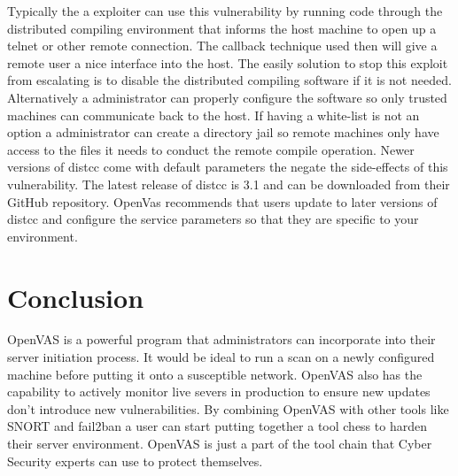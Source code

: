 \documentclass[12pt]{article}
\begin{document}
Typically the a exploiter can use this vulnerability by running code through
the distributed compiling environment that informs the host machine to open
up a telnet or other remote connection. The callback technique used then will
give a remote user a nice interface into the host. The easily solution to 
stop this exploit from escalating is to disable the distributed compiling
software if it is not needed. Alternatively a administrator can properly
configure the software so only trusted machines can communicate back to
the host. If having a white-list is not an option a administrator can create
a directory jail so remote machines only have access to the files it needs
to conduct the remote compile operation. Newer versions of distcc come with
default parameters the negate the side-effects of this vulnerability. The 
latest release of distcc is 3.1 and can be downloaded from their GitHub
repository. OpenVas recommends that users update to later versions of
distcc and configure the service parameters so that they are specific to
your environment. 

\section{Conclusion}
\label{sect:conclusion}
OpenVAS is a powerful program that administrators can incorporate into their
server initiation process. It would be ideal to run a scan on a newly 
configured machine before putting it onto a susceptible network. OpenVAS also
has the capability to actively monitor live severs in production to ensure
new updates don't introduce new vulnerabilities. By combining OpenVAS with
other tools like SNORT and fail2ban a user can start putting together a 
tool chess to harden their server environment. OpenVAS is just a part of
the tool chain that Cyber Security experts can use to protect themselves. 

\nocite{*}


\end{document}
